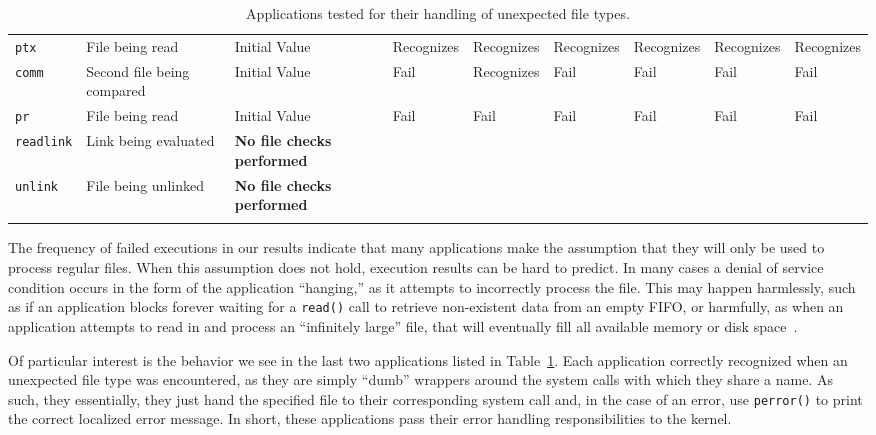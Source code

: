 \begin{table}[t]
\begin{tabular}{l  l  |  l  l  l  l  l  l  l}
        {\tt ptx}         & File being read            & Initial Value  & Recognizes     & Recognizes  & Recognizes & Recognizes  & Recognizes & Recognizes\\
        {\tt comm}        & Second file being compared & Initial Value  & Fail           & Recognizes  & Fail       & Fail        & Fail       & Fail\\
        {\tt pr}          & File being read            & Initial Value  & Fail           & Fail        & Fail       & Fail        & Fail       & Fail\\
\hline
        {\tt readlink}    & Link being evaluated       & \textbf{No file checks performed} & & & & & & \\
        {\tt unlink}      & File being unlinked        & \textbf{No file checks performed} & & & & & & \\
    \bottomrule{}
    \end{tabular}
    \caption{Applications tested for their handling of unexpected file types.}
    \label{table:unexpectedtypes}
\end{table}

The frequency of failed executions in our results indicate that many
applications make the assumption that they will only be used to process
regular files.  When this assumption does not hold, execution results
can be hard to predict.  In many cases a denial of
service condition occurs in the form of the application ``hanging,'' as it
attempts to incorrectly process the file.  This may happen harmlessly, such
as if an application blocks forever waiting for a {\tt read()}
call to retrieve non-existent data from an empty FIFO, or harmfully, as
when an application attempts to read in and process an
``infinitely large'' file, that will eventually fill all
available memory or disk
space~\cite{Cappos_CCS_08}.

Of particular interest is the behavior we see in the last two applications
listed in Table~\ref{table:unexpectedtypes}.  Each application correctly
recognized when an unexpected file type was encountered, as they
are simply ``dumb'' wrappers around the system calls
with which they share a name.  As such, they essentially,
they just hand the specified
file to their corresponding system call and, in the case of an error, use
{\tt perror()} to print the correct localized error message.  In short,
these applications pass their error handling responsibilities to the
kernel.

